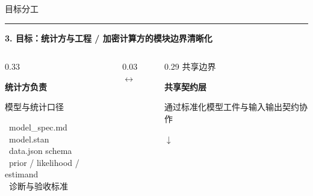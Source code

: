 \documentclass[UTF8,aspectratio=169,fontset=fandol]{ctexbeamer}
\newcommand{\midpaneltopgap}{\vspace{0.35em}}
\newcommand{\midpanelminitopgap}{\vspace{0.55em}}
\begin{document}
\begin{frame}[t,shrink=10]
\vspace{0.2em}
{\color{textgray}\Large 目标分工}\par
\vspace{0.35em}
{\color{linegray}\rule{\textwidth}{0.5pt}}\par
\vspace{0.30em}

{\Large\bfseries 3. 目标：统计方与工程 / 加密计算方的模块边界清晰化}\par
\vspace{0.7em}

\begin{columns}[T,onlytextwidth]
\begin{column}{0.33\textwidth}
\begin{leftpanel}
{\fontsize{14}{16}\selectfont\bfseries\color{blue1} 统计方负责}\par
{\small\color{textgray} 模型与统计口径}\par
\vspace{0.25em}

\footnotesize
\textbullet\ model\_spec.md\\
\textbullet\ model.stan\\
\textbullet\ data.json schema\\
\textbullet\ prior / likelihood / estimand\\
\textbullet\ 诊断与验收标准
\end{leftpanel}
\end{column}

\begin{column}{0.03\textwidth}
\vspace*{0.17\textheight}
{\fontsize{10}{10}\selectfont\color{arrowgray}$\leftrightarrow$}
\end{column}

\begin{column}{0.29\textwidth}
\centering
{\small\color{textgray} 共享边界}\par
\vspace{0.1em}

\begin{midpanel}
{\fontsize{13}{15}\selectfont\bfseries 共享契约层}\par
\vspace{0.35em}

{\small 通过标准化模型工件与输入输出契约协作}\par
\midpaneltopgap
{\large\color{arrowgray}$\downarrow$}\par
\midpanelminitopgap


\end{midpanel}
\end{column}
\end{columns}
\end{frame}
\end{document}
